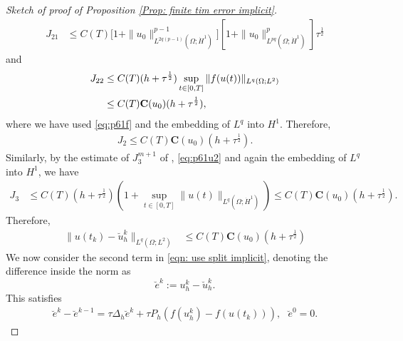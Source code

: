 \documentclass[reqno, 11pt]{amsart}
\theoremstyle{plain}
\theoremstyle{definition}
\theoremstyle{remark}
\numberwithin{equation}{section}
\numberwithin{theorem}{section}
\newcommand{\con}{\mathbf{C}}
\begin{document}
{\begin{proof}[Sketch of proof of Proposition \ref{Prop: finite tim error implicit}]
\begin{align}
J_{21}&\leq C(T)\big[1+\|u_0\|_{L^{2q(p-1)}(\Omega;\dot{H}^1)}^{p-1}\big][1+\|u_0\|_{L^{pq}(\Omega;\dot{H}^1)}^p]\tau^{\frac{1}{2}}
\end{align}
and 
\begin{align}
J_{22}&\leq C(T)(h+\tau^{\frac{1}{2}})\sup\limits_{t\in [0,T]}\|f(u(t))\|_{L^{q}(\Omega;L^2)}\notag\\
&\leq C(T)\con(u_0)(h+\tau^{\frac{1}{2}}),
\end{align}
where we have used \eqref{eq:p61f} and the embedding of $L^q$ into $H^1$. 
Therefore, 
\begin{align}
J_2\leq C(T) \con(u_0)(h+\tau^{\frac{1}{2}}) .
\end{align}
Similarly, by the estimate of $J_3^{m+1}$ of \cite[Lemma 4.2]{liu2021strong},  \eqref{eq:p61u2} and again  the embedding of $L^q$ into $H^1$, we have
\begin{align}
J_3&\leq C(T)(h+\tau^{\frac{1}{2}})(1+\sup\limits_{t\in [0,T]}\|u(t)\|_{L^q(\Omega;\dot{H}^1)})\leq C(T) \con(u_0)(h+\tau^{\frac{1}{2}}).
\end{align}
Therefore, 
\begin{align}\label{eq:erruhat1}
\|u(t_k)-\breve{u}_h^k\|_{L^q(\Omega;L^2)}&\leq C(T) \con(u_0)(h+\tau^{\frac{1}{2}})
\end{align}
{We now consider the second term in \eqref{eqn: use split implicit}, denoting the difference inside the norm as
\begin{equation}
\label{e:ekchk}
    \breve{e}^k:=u_h^k-\breve{u}_h^k.
\end{equation}
This} satisfies
\begin{align}
\breve{e}^k-\breve{e}^{k-1}=\tau\Delta_h\breve{e}^k+\tau P_h(f(u_h^k)-f(u(t_k))),\ \ \ \breve{e}^0=0.
\end{align}


\end{proof}}
\end{document}
